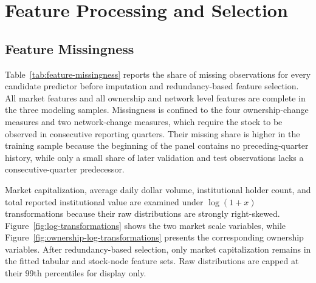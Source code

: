 \section{Feature Processing and Selection}
\label{app:feature_processing}

\subsection{Feature Missingness}

Table~\ref{tab:feature-missingness} reports the share of missing observations for every candidate predictor before imputation and redundancy-based feature selection. All market features and all ownership and network level features are complete in the three modeling samples. Missingness is confined to the four ownership-change measures and two network-change measures, which require the stock to be observed in consecutive reporting quarters. Their missing share is higher in the training sample because the beginning of the panel contains no preceding-quarter history, while only a small share of later validation and test observations lacks a consecutive-quarter predecessor.



\noindent
Market capitalization, average daily dollar volume, institutional holder count, and total reported institutional value are examined under $\log(1+x)$ transformations because their raw distributions are strongly right-skewed. Figure~\ref{fig:log-transformations} shows the two market scale variables, while Figure~\ref{fig:ownership-log-transformations} presents the corresponding ownership variables. After redundancy-based selection, only market capitalization remains in the fitted tabular and stock-node feature sets. Raw distributions are capped at their 99th percentiles for display only.

